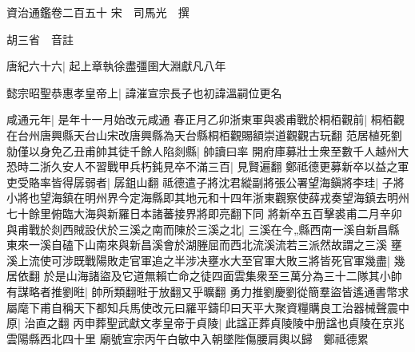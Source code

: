 資治通鑑卷二百五十
宋　司馬光　撰

胡三省　音註

唐紀六十六|{
	起上章執徐盡彊圉大淵獻凡八年}


懿宗昭聖恭惠孝皇帝上|{
	諱漼宣宗長子也初諱溫嗣位更名}


咸通元年|{
	是年十一月始改元咸通}
春正月乙卯浙東軍與裘甫戰於桐栢觀前|{
	桐栢觀在台州唐興縣天台山宋改唐興縣為天台縣桐栢觀賜額崇道觀觀古玩翻}
范居植死劉勍僅以身免乙丑甫帥其徒千餘人陷剡縣|{
	帥讀曰率}
開府庫募壯士衆至數千人越州大恐時二浙久安人不習戰甲兵朽鈍見卒不滿三百|{
	見賢遍翻}
鄭祗德更募新卒以益之軍吏受賂率皆得孱弱者|{
	孱鉏山翻}
祗德遣子將沈君縱副將張公署望海鎭將李珪|{
	子將小將也望海鎮在明州界今定海縣即其地元和十四年浙東觀察使薛戎奏望海鎮去明州七十餘里俯臨大海與新羅日本諸蕃接界將即亮翻下同}
將新卒五百擊裘甫二月辛卯與甫戰於剡西賊設伏於三溪之南而陳於三溪之北|{
	三溪在今縣西南一溪自新昌縣東來一溪自磕下山南來與新昌溪會於湖塍屈而西北流溪流若三派然故謂之三溪}
壅溪上流使可涉既戰陽敗走官軍追之半涉决壅水大至官軍大敗三將皆死官軍幾盡|{
	幾居依翻}
於是山海諸盜及它道無賴亡命之徒四面雲集衆至三萬分為三十二隊其小帥有謀略者推劉暀|{
	帥所類翻暀于放翻又乎曠翻}
勇力推劉慶劉從簡羣盜皆遙通書幣求屬麾下甫自稱天下都知兵馬使改元曰羅平鑄印曰天平大聚資糧購良工治器械聲震中原|{
	治直之翻}
丙申葬聖武獻文孝皇帝于貞陵|{
	此諡正葬貞陵陵中册諡也貞陵在京兆雲陽縣西北四十里}
廟號宣宗丙午白敏中入朝墜陛傷腰肩輿以歸　鄭祗德累


